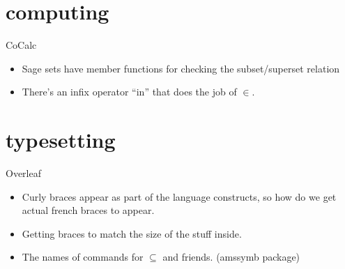 \documentclass[handout,landscape]{beamer}
\begin{document}
\section{computing}

\begin{frame}{CoCalc}
\begin{itemize}
\item Sage sets have member functions for checking the subset/superset relation
\item There's an infix operator ``in'' that does the job of $\in$.
\end{itemize}
\end{frame}

\section{typesetting}

\begin{frame}{Overleaf}
\begin{itemize}
\item Curly braces appear as part of the language constructs, so how do we get actual french braces to appear. 
\item Getting braces to match the size of the stuff inside.
\item The names of commands for $\subseteq$ and friends. (amssymb package)
\end{itemize}
\end{frame}
\end{document}
